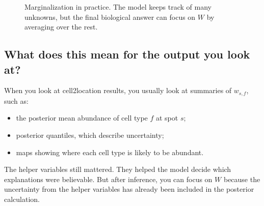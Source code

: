 \documentclass[11pt]{article}
\begin{document}
\begin{figure}[H]
\centering
{}
\caption{Marginalization in practice. The model keeps track of many unknowns, but the final biological answer can focus on $W$ by averaging over the rest.}
\end{figure}

\subsection{What does this mean for the output you look at?}

When you look at cell2location results, you usually look at summaries of $w_{s,f}$, such as:

\begin{itemize}
  \item the posterior mean abundance of cell type $f$ at spot $s$;
  \item posterior quantiles, which describe uncertainty;
  \item maps showing where each cell type is likely to be abundant.
\end{itemize}

The helper variables still mattered. They helped the model decide which explanations were believable. But after inference, you can focus on $W$ because the uncertainty from the helper variables has already been included in the posterior calculation.
\end{document}
